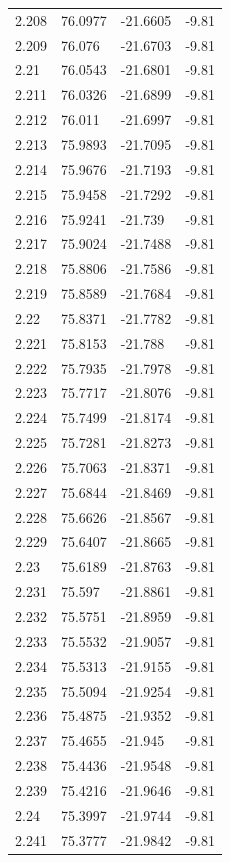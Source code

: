 \begin{tabular}{llll}
2.208 & 76.0977 & -21.6605 & -9.81 \\
2.209 & 76.076 & -21.6703 & -9.81 \\
2.21 & 76.0543 & -21.6801 & -9.81 \\
2.211 & 76.0326 & -21.6899 & -9.81 \\
2.212 & 76.011 & -21.6997 & -9.81 \\
2.213 & 75.9893 & -21.7095 & -9.81 \\
2.214 & 75.9676 & -21.7193 & -9.81 \\
2.215 & 75.9458 & -21.7292 & -9.81 \\
2.216 & 75.9241 & -21.739 & -9.81 \\
2.217 & 75.9024 & -21.7488 & -9.81 \\
2.218 & 75.8806 & -21.7586 & -9.81 \\
2.219 & 75.8589 & -21.7684 & -9.81 \\
2.22 & 75.8371 & -21.7782 & -9.81 \\
2.221 & 75.8153 & -21.788 & -9.81 \\
2.222 & 75.7935 & -21.7978 & -9.81 \\
2.223 & 75.7717 & -21.8076 & -9.81 \\
2.224 & 75.7499 & -21.8174 & -9.81 \\
2.225 & 75.7281 & -21.8273 & -9.81 \\
2.226 & 75.7063 & -21.8371 & -9.81 \\
2.227 & 75.6844 & -21.8469 & -9.81 \\
2.228 & 75.6626 & -21.8567 & -9.81 \\
2.229 & 75.6407 & -21.8665 & -9.81 \\
2.23 & 75.6189 & -21.8763 & -9.81 \\
2.231 & 75.597 & -21.8861 & -9.81 \\
2.232 & 75.5751 & -21.8959 & -9.81 \\
2.233 & 75.5532 & -21.9057 & -9.81 \\
2.234 & 75.5313 & -21.9155 & -9.81 \\
2.235 & 75.5094 & -21.9254 & -9.81 \\
2.236 & 75.4875 & -21.9352 & -9.81 \\
2.237 & 75.4655 & -21.945 & -9.81 \\
2.238 & 75.4436 & -21.9548 & -9.81 \\
2.239 & 75.4216 & -21.9646 & -9.81 \\
2.24 & 75.3997 & -21.9744 & -9.81 \\
2.241 & 75.3777 & -21.9842 & -9.81 \\

\end{tabular}
